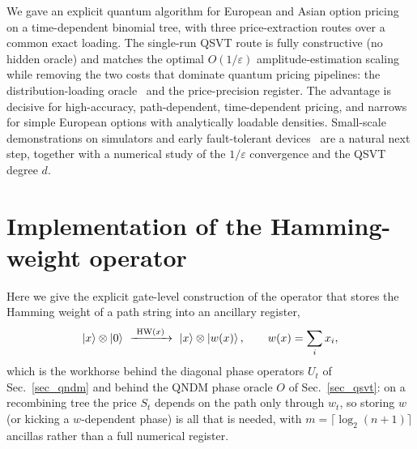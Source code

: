 \documentclass[11pt]{article}
\begin{document}
We gave an explicit quantum algorithm for European and Asian option pricing on a time-dependent binomial tree, with three price-extraction routes over a common exact loading. The single-run QSVT route is fully constructive (no hidden oracle) and matches the optimal $O(1/\varepsilon)$ amplitude-estimation scaling~\cite{brassard2002amplitude,montanaro2015quantum} while removing the two costs that dominate quantum pricing pipelines: the distribution-loading oracle~\cite{Stamatopoulos_2020,chakrabarti2021threshold} and the price-precision register. The advantage is decisive for high-accuracy, path-dependent, time-dependent pricing, and narrows for simple European options with analytically loadable densities. Small-scale demonstrations on simulators and early fault-tolerant devices~\cite{dong2022qetu,martin2021asian} are a natural next step, together with a numerical study of the $1/\varepsilon$ convergence and the QSVT degree $d$.

\newpage
\appendix

\section{Implementation of the Hamming-weight operator}\label{app_hw}

Here we give the explicit gate-level construction of the operator that stores the Hamming weight of a path string into an ancillary register,
\begin{equation}\label{eq_hw_map}
\ket{x}\otimes\ket{0}\ \xrightarrow{\ \mathrm{HW}(x)\ }\ \ket{x}\otimes\ket{w(x)},
\qquad w(x)=\sum_{i}x_i,
\end{equation}
which is the workhorse behind the diagonal phase operators $U_t$ of Sec.~\ref{sec_qndm} and behind the QNDM phase oracle $O$ of Sec.~\ref{sec_qsvt}: on a recombining tree the price $S_t$ depends on the path only through $w_t$, so storing $w$ (or kicking a $w$-dependent phase) is all that is needed, with $m=\lceil\log_2(n+1)\rceil$ ancillas rather than a full numerical register.
\end{document}
